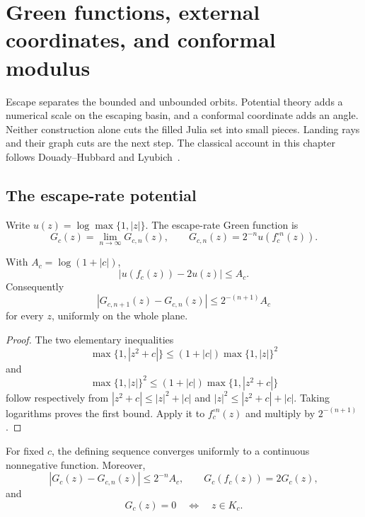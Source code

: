 \chapter[Green functions and conformal geometry]{Green functions, external coordinates, and conformal modulus}
\label{chap:analytic-foundations}

Escape separates the bounded and unbounded orbits.  Potential theory
adds a numerical scale on the escaping basin, and a conformal coordinate
adds an angle.  Neither construction alone cuts the filled Julia set
into small pieces.  Landing rays and their graph cuts are the next step.
The classical account in this chapter follows
Douady--Hubbard and Lyubich~\cite{DH,LyubichBook,LyubichNotes}.

\section{The escape-rate potential}

\begin{definition}
\label{def:green-function}
Write $u(z)=\log\max\{1,|z|\}$.  The escape-rate Green function is
\[
 G_c(z)=\lim_{n\to\infty}G_{c,n}(z),\qquad
 G_{c,n}(z)=2^{-n}u(f_c^{\circ n}(z)).
\]
\end{definition}

\begin{lemma}
\label{lem:green-telescope}
With $A_c=\log(1+|c|)$,
\[
 |u(f_c(z))-2u(z)|\le A_c.
\]
Consequently
\[
 |G_{c,n+1}(z)-G_{c,n}(z)|\le2^{-(n+1)}A_c
\]
for every $z$, uniformly on the whole plane.
\end{lemma}

\begin{proof}
The two elementary inequalities
\[
 \max\{1,|z^2+c|\}\le(1+|c|)\max\{1,|z|\}^2
\]
and
\[
 \max\{1,|z|\}^2\le(1+|c|)\max\{1,|z^2+c|\}
\]
follow respectively from $|z^2+c|\le|z|^2+|c|$ and
$|z|^2\le|z^2+c|+|c|$.  Taking logarithms proves the first bound.
Apply it to $f_c^{\circ n}(z)$ and multiply by $2^{-(n+1)}$.
\end{proof}

\begin{theorem}
\label{thm:green-properties}
For fixed $c$, the defining sequence converges uniformly to a continuous
nonnegative function.  Moreover,
\[
 |G_c(z)-G_{c,n}(z)|\le2^{-n}A_c,\qquad
 G_c(f_c(z))=2G_c(z),
\]
and
\[
 G_c(z)=0\quad\Longleftrightarrow\quad z\in K_c.
\]
\end{theorem}

